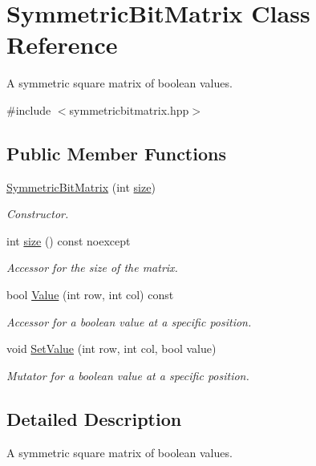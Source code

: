 \hypertarget{class_symmetric_bit_matrix}{}\section{Symmetric\+Bit\+Matrix Class Reference}
\label{class_symmetric_bit_matrix}


A symmetric square matrix of boolean values.  




{\ttfamily \#include $<$symmetricbitmatrix.\+hpp$>$}

\subsection*{Public Member Functions}
\begin{DoxyCompactItemize}
\item 
\hyperlink{class_symmetric_bit_matrix_a828dbcd597cd13390922d863357da3f3}{Symmetric\+Bit\+Matrix} (int \hyperlink{class_symmetric_bit_matrix_aed948744d70716f6325063ed55a76c6c}{size})
\begin{DoxyCompactList}\small\item\em Constructor. \end{DoxyCompactList}\item 
int \hyperlink{class_symmetric_bit_matrix_aed948744d70716f6325063ed55a76c6c}{size} () const noexcept
\begin{DoxyCompactList}\small\item\em Accessor for the size of the matrix. \end{DoxyCompactList}\item 
bool \hyperlink{class_symmetric_bit_matrix_a02221e8620c41734a56ec329da1b66c6}{Value} (int row, int col) const
\begin{DoxyCompactList}\small\item\em Accessor for a boolean value at a specific position. \end{DoxyCompactList}\item 
void \hyperlink{class_symmetric_bit_matrix_a5d97dfec2cf3910b2f46b80307528c43}{Set\+Value} (int row, int col, bool value)
\begin{DoxyCompactList}\small\item\em Mutator for a boolean value at a specific position. \end{DoxyCompactList}\end{DoxyCompactItemize}


\subsection{Detailed Description}
A symmetric square matrix of boolean values. 

